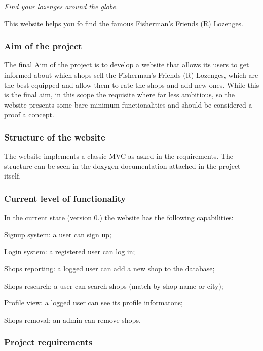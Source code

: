 {\itshape Find your lozenges around the globe.}

This website helps you fo find the famous Fisherman's Friends (R) Lozenges.

\subsubsection*{Aim of the project}

The final Aim of the project is to develop a website that allows its users to get informed about which shops sell the Fisherman's Friends (R) Lozenges, which are the best equipped and allow them to rate the shops and add new ones. While this is the final aim, in this scope the requisite where far less ambitious, so the website presents some bare minimum functionalities and should be considered a proof a concept.

\subsubsection*{Structure of the website}

The website implements a classic M\+V\+C as asked in the requirements. The structure can be seen in the doxygen documentation attached in the project itself.

\subsubsection*{Current level of functionality}

In the current state (version 0.) the website has the following capabilities\+:


\begin{DoxyItemize}
\item Signup system\+: a user can sign up;
\item Login system\+: a registered user can log in;
\item Shops reporting\+: a logged user can add a new shop to the database;
\item Shops research\+: a user can search shops (match by shop name or city);
\item Profile view\+: a logged user can see its profile informatons;
\item Shops removal\+: an admin can remove shops.
\end{DoxyItemize}

\subsubsection*{Project requirements}


